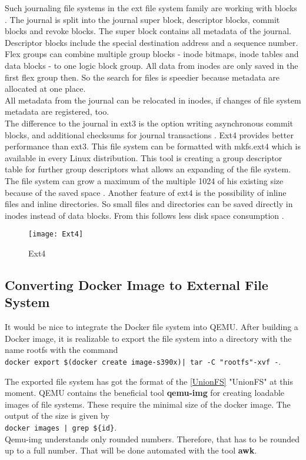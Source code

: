 Such journaling file systems in the ext file system family are working with blocks \cite[~p.20]{Seufert2015}.
The journal is split into the journal super block, descriptor blocks, commit blocks and revoke blocks.
The super block contains all metadata of the journal. Descriptor blocks include the special destination address and a sequence number. 
Flex groups can combine multiple group blocks - inode bitmaps, inode tables and data blocks - to one logic block group. All data from inodes are only saved in the first flex group then. 
So the search for files is speedier because metadata are allocated at one place.\\
All metadata from the journal can be relocated in inodes, if changes of file system metadata are registered, too. \\
The difference to the journal in ext3 is the option writing asynchronous commit blocks, and additional checksums for journal transactions \cite[~p.28]{Seufert2015}.
Ext4 provides better performance than ext3. 
This file system can be formatted with mkfs.ext4 which is available in every Linux distribution.
This tool is creating a group descriptor table for further group descriptors what allows an expanding of the file system. The file system can grow a maximum of the multiple 1024 of his existing size because of the saved space \cite[~p.21]{Seufert2015}. 
Another feature of ext4 is the possibility of inline files and inline directories. So small files and directories can be saved directly in inodes instead of data blocks. From this follows less disk space consumption \cite[p.24]{Seufert2015}.

\begin{figure}[H]
\centering
\texttt{[image: Ext4]}
 \caption{Ext4}
    \label{Ext4}
\end{figure}

\subsection{Converting Docker Image to External File System} \label{ExternalFile system}

It would be nice to integrate the Docker file system into \gls{QEMU}. After building a Docker
image, it is realizable to export the file system into a directory with the name rootfs with
the command \\
\lstinline!docker export $(docker create image-s390x)| tar -C "rootfs"-xvf -!.

The exported file system has got the format of the \ref{UnionFS} "UnionFS" at this moment. \gls{QEMU} contains the beneficial tool \textbf{qemu-img} for creating loadable images of file systems. These require the minimal size of the docker image. The output of the size is given by \\
\lstinline!docker images | grep ${id}!.\\ 
Qemu-img understands only rounded numbers. Therefore, that has to be rounded up to a full number. That will be done automated with the tool \textbf{awk}. 

